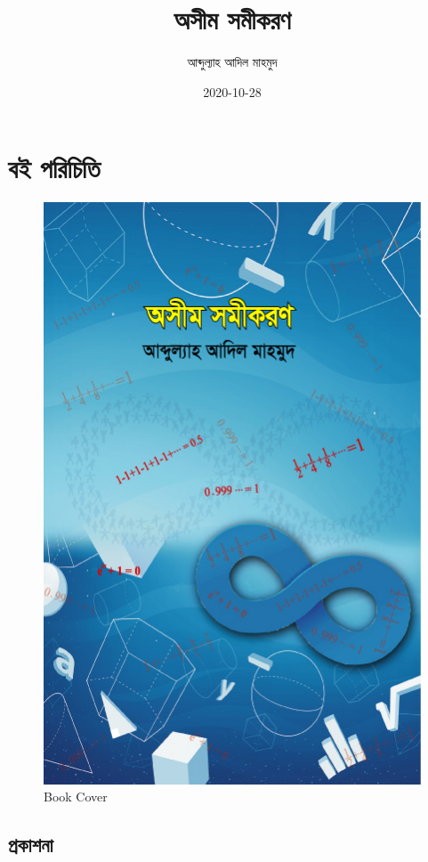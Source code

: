 \documentclass[
]{book}
\title{অসীম সমীকরণ}
\author{আব্দুল্যাহ আদিল মাহমুদ}
\date{2020-10-28}
\begin{document}
\maketitle

{
\setcounter{tocdepth}{1}
\tableofcontents
}
\hypertarget{ux9acux987-ux9aaux9b0ux9bfux99aux9bfux9a4ux9bf}{%
\chapter*{বই পরিচিতি}\label{ux9acux987-ux9aaux9b0ux9bfux99aux9bfux9a4ux9bf}}

\begin{figure}

{\centering \includegraphics[width=0.8\linewidth]{os_cover} 

}

\caption{Book Cover}\label{fig:cover}
\end{figure}

\hypertarget{ux9aaux9cdux9b0ux995ux9beux9b6ux9a8ux9be}{%
\section{প্রকাশনা}\label{ux9aaux9cdux9b0ux995ux9beux9b6ux9a8ux9be}}
\end{document}
